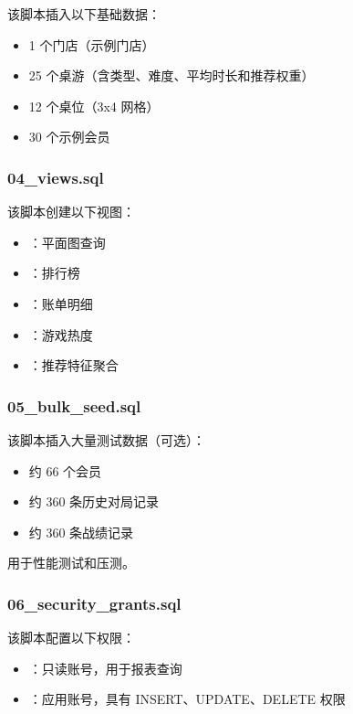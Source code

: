 该脚本插入以下基础数据：

\begin{itemize}
  \item 1 个门店（示例门店）
  \item 25 个桌游（含类型、难度、平均时长和推荐权重）
  \item 12 个桌位（3x4 网格）
  \item 30 个示例会员
\end{itemize}

\subsubsection{04\_views.sql}

该脚本创建以下视图：

\begin{itemize}
  \item {}：平面图查询
  \item {}：排行榜
  \item {}：账单明细
  \item {}：游戏热度
  \item {}：推荐特征聚合
\end{itemize}

\subsubsection{05\_bulk\_seed.sql}

该脚本插入大量测试数据（可选）：

\begin{itemize}
  \item 约 66 个会员
  \item 约 360 条历史对局记录
  \item 约 360 条战绩记录
\end{itemize}

用于性能测试和压测。

\subsubsection{06\_security\_grants.sql}

该脚本配置以下权限：

\begin{itemize}
  \item {}：只读账号，用于报表查询
  \item {}：应用账号，具有 INSERT、UPDATE、DELETE 权限
\end{itemize}

